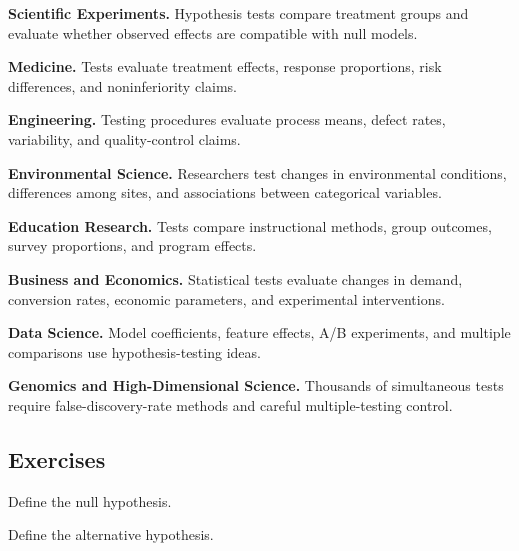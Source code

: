 \begin{applicationbox}

\textbf{Scientific Experiments.}
Hypothesis tests compare treatment groups and evaluate whether observed
effects are compatible with null models.

\medskip

\textbf{Medicine.}
Tests evaluate treatment effects, response proportions, risk
differences, and noninferiority claims.

\medskip

\textbf{Engineering.}
Testing procedures evaluate process means, defect rates, variability,
and quality-control claims.

\medskip

\textbf{Environmental Science.}
Researchers test changes in environmental conditions, differences among
sites, and associations between categorical variables.

\medskip

\textbf{Education Research.}
Tests compare instructional methods, group outcomes, survey proportions,
and program effects.

\medskip

\textbf{Business and Economics.}
Statistical tests evaluate changes in demand, conversion rates, economic
parameters, and experimental interventions.

\medskip

\textbf{Data Science.}
Model coefficients, feature effects, A/B experiments, and multiple
comparisons use hypothesis-testing ideas.

\medskip

\textbf{Genomics and High-Dimensional Science.}
Thousands of simultaneous tests require false-discovery-rate methods and
careful multiple-testing control.

\end{applicationbox}

\subsection{Exercises}
\label{subsec:hypothesis-testing-exercises}

\begin{exercise}[1]
Define the null hypothesis.
\end{exercise}

\begin{exercise}[1]
Define the alternative hypothesis.
\end{exercise}

